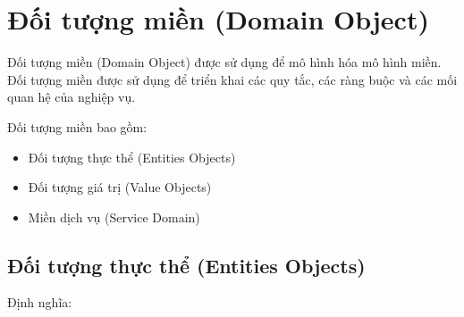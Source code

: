 












\section{Đối tượng miền (Domain Object)}

Đối tượng miền (Domain Object) được sử dụng để mô hình hóa mô hình miền. Đối tượng miền được sử dụng để triển khai các quy tắc, các ràng buộc và các mối quan hệ của nghiệp vụ.

Đối tượng miền bao gồm:

\begin{itemize}

    \item Đối tượng thực thể (Entities Objects)

    \item Đối tượng giá trị (Value Objects)

    \item Miền dịch vụ (Service Domain)

\end{itemize}

\subsection{Đối tượng thực thể (Entities Objects)}



Định nghĩa:

